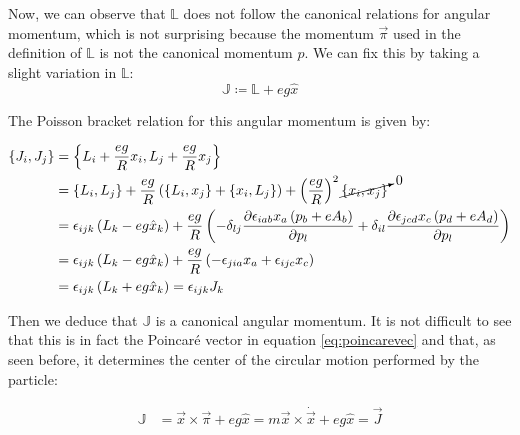 Now, we can observe that $\mathbb{L}$ does not follow the canonical relations for angular momentum, which is not surprising because the momentum $\vec{\pi}$ used in the definition of $\mathbb{L}$ is not the canonical momentum $p$. We can fix this by taking a slight variation in $\mathbb{L}$:\\

\begin{equation}
\mathbb{J} \coloneqq \mathbb{L} + eg\hat{x}
\label{eq:ham poincarevec}
\end{equation}

The Poisson bracket relation for this angular momentum is given by:

\begin{align*}
\left\lbrace J_i, J_j \right\rbrace &= \left\lbrace L_i + \frac{eg}{R}x_i, L_j + \frac{eg}{R}x_j \right\rbrace\\
&= \left\lbrace L_i, L_j \right\rbrace + \frac{eg}{R}\left( \left\lbrace L_i, x_j \right\rbrace +\left\lbrace x_i, L_j \right\rbrace \right) + \left( \frac{eg}{R} \right)^2\cancelto{0}{\left\lbrace x_i, x_j \right\rbrace}\\
& = \epsilon_{ijk}\left( L_k-{eg}\hat{x}_k \right)+\frac{eg}{R}\left( -\delta_{lj}\frac{\partial \epsilon_{iab}x_a\left( p_b+eA_b \right)}{\partial p_l}+ \delta_{il}\frac{\partial\epsilon_{jcd}x_c\left( p_d+eA_d \right)}{\partial p_l} \right)\\
& = \epsilon_{ijk}\left( L_k-{eg}\hat{x}_k \right)+ \frac{eg}{R}\left( -\epsilon_{jia}x_a+\epsilon_{ijc}x_c \right)\\
&= \epsilon_{ijk}\left( L_k+{eg}\hat{x}_k \right) = \epsilon_{ijk}J_k
\end{align*}

Then we deduce that $\mathbb{J}$ is a canonical angular momentum. It is not difficult to see that this is in fact the Poincar\'e vector in equation \eqref{eq:poincarevec} and that, as seen before, it determines the center of the circular motion performed by the particle:

\begin{align*}
\mathbb{J} &= \vec{x}\times\vec{\pi}+{eg}\hat{x} = m{\vec{x}}\times\dot{\vec{x}} + eg\hat{x} = \vec{J}\\ 
\end{align*}



